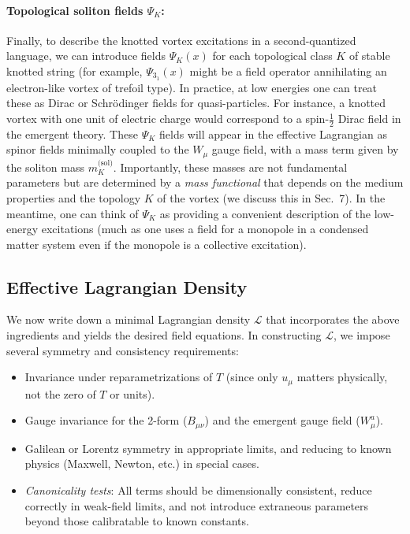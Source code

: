 \documentclass[10pt,reprint,aps,onecolumn,nofootinbib]{revtex4-2}
\begin{document}
\paragraph{Topological soliton fields $\Psi_{K}$:} Finally, to describe the knotted vortex excitations in a second-quantized language, we can introduce fields $\Psi_{K}(x)$ for each topological class $K$ of stable knotted string (for example, $\Psi_{3_1}(x)$ might be a field operator annihilating an electron-like vortex of trefoil type). In practice, at low energies one can treat these as Dirac or Schrödinger fields for quasi-particles. For instance, a knotted vortex with one unit of electric charge would correspond to a spin-$\frac{1}{2}$ Dirac field in the emergent theory. These $\Psi_K$ fields will appear in the effective Lagrangian as spinor fields minimally coupled to the $W_\mu$ gauge field, with a mass term given by the soliton mass $m^{\text{(sol)}}_K$. Importantly, these masses are not fundamental parameters but are determined by a \emph{mass functional} that depends on the medium properties and the topology $K$ of the vortex (we discuss this in Sec.~7). In the meantime, one can think of $\Psi_K$ as providing a convenient description of the low-energy excitations (much as one uses a field for a monopole in a condensed matter system even if the monopole is a collective excitation).


\subsection{Effective Lagrangian Density}

We now write down a minimal Lagrangian density $\mathcal{L}$ that incorporates the above ingredients and yields the desired field equations. In constructing $\mathcal{L}$, we impose several symmetry and consistency requirements:

\begin{itemize}
\item Invariance under reparametrizations of $T$ (since only $u_\mu$ matters physically, not the zero of $T$ or units).
\item Gauge invariance for the 2-form ($B_{\mu\nu}$) and the emergent gauge field ($W_\mu^a$).
\item Galilean or Lorentz symmetry in appropriate limits, and reducing to known physics (Maxwell, Newton, etc.) in special cases.
\item \textit{Canonicality tests}: All terms should be dimensionally consistent, reduce correctly in weak-field limits, and not introduce extraneous parameters beyond those calibratable to known constants.
\end{itemize}
\end{document}
